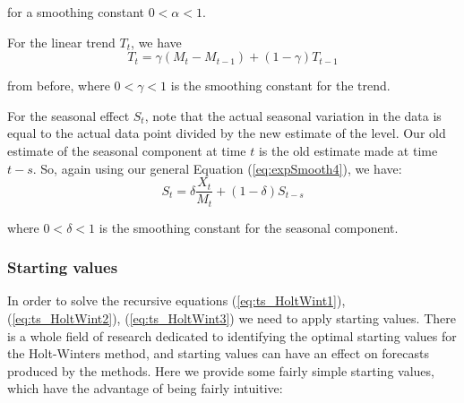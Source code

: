 \documentclass[12pt,a4paper,openany,twoside]{report}
\theoremstyle{definition}
\theoremstyle{remark}
\theoremstyle{plain}
\theoremstyle{definition}
\theoremstyle{definition}
\theoremstyle{definition}
\theoremstyle{remark}
\begin{document}
for a smoothing constant \(0 < \alpha < 1\).

For the linear trend \(T_{t}\), we have
\begin{equation}
T_{t} = \gamma\left( M_{t} - M_{t - 1} \right) + (1 - \gamma)T_{t - 1}
\label{eq:ts_HoltWint2}
\end{equation}

from before, where \(0 < \gamma < 1\) is the smoothing constant for the
trend.

For the seasonal effect \(S_{t}\), note that the actual seasonal
variation in the data is equal to the actual data point divided by the
new estimate of the level. Our old estimate of the seasonal component at
time \(t\) is the old estimate made at time \(t - s\). So, again using
our general Equation (\ref{eq:expSmooth4}), we have:
\begin{equation}
S_{t} = \delta \frac{X_{t}}{M_{t}} + (1-\delta)S_{t - s}
\label{eq:ts_HoltWint3}
\end{equation}

where \(0 < \delta < 1\) is the smoothing constant for the seasonal
component.

\hypertarget{starting-values}{%
\subsubsection*{Starting values}\label{starting-values}}

In order to solve the recursive equations (\ref{eq:ts_HoltWint1}), (\ref{eq:ts_HoltWint2}), (\ref{eq:ts_HoltWint3}) we need
to apply starting values. There is a whole field of research dedicated
to identifying the optimal starting values for the Holt-Winters method,
and starting values can have an effect on forecasts produced by the
methods. Here we provide some fairly simple starting values, which have
the advantage of being fairly intuitive:
\end{document}
